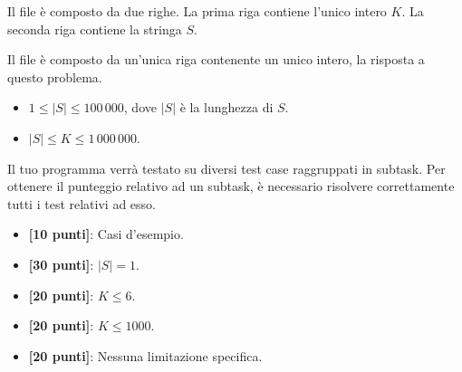 \InputFile
Il file  è composto da due righe. La prima riga contiene l'unico intero $K$. La seconda riga contiene la stringa $S$.

\OutputFile
Il file \outputfile{} è composto da un'unica riga contenente un unico intero, la risposta a questo problema.

\Constraints
\begin{itemize}[nolistsep, itemsep=2mm]
	\item $1 \le |S| \le 100\,000$, dove $|S|$ è la lunghezza di $S$.
	\item $|S| \le K \le 1\,000\,000$.
\end{itemize}

\Scoring
Il tuo programma verrà testato su diversi test case raggruppati in subtask.
Per ottenere il punteggio relativo ad un subtask, è necessario risolvere
correttamente tutti i test relativi ad esso.

\begin{itemize}[nolistsep,itemsep=2mm]
  \item \textbf{ [10 punti]}: Casi d'esempio.
  \item \textbf{ [30 punti]}: $|S| = 1$.
  \item \textbf{ [20 punti]}: $K \le 6$.
  \item \textbf{ [20 punti]}: $K \le 1000$.
  \item \textbf{ [20 punti]}: Nessuna limitazione specifica.
\end{itemize}



\Examples
\begin{example}
%
%
%
\end{example}
